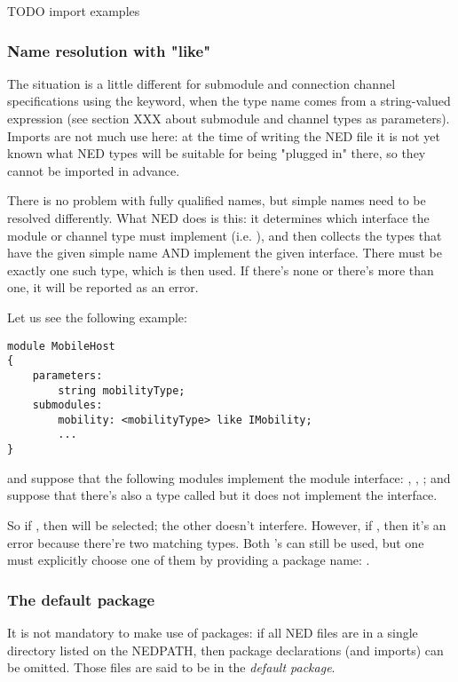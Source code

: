 TODO import examples


\subsubsection{Name resolution with "like"}

The situation is a little different for submodule and connection channel
specifications using the  keyword, when the type name comes
from a string-valued expression (see section XXX about submodule and
channel types as parameters). Imports are not much use here: at the time of
writing the NED file it is not yet known what NED types will be suitable
for being "plugged in" there, so they cannot be imported in advance.

There is no problem with fully qualified names, but simple names need
to be resolved differently. What NED does is this: it determines which
interface the module or channel type must implement (i.e. ),
and then collects the types that have the given simple name AND implement
the given interface. There must be exactly one such type, which is then used.
If there's none or there's more than one, it will be reported as an error.

Let us see the following example:

\begin{Verbatim}
module MobileHost
{
    parameters:
        string mobilityType;
    submodules:
        mobility: <mobilityType> like IMobility;
        ...
}
\end{Verbatim}

and suppose that the following modules implement the  module
interface: , ,
; and suppose that there's also a type
called  but it does not implement the
interface.

So if , then
 will be selected; the other
 doesn't interfere. However, if
, then it's an error because there're two
matching  types. Both 's can still be used,
but one must explicitly choose one of them by providing a package name:
.


\subsubsection{The default package}

It is not mandatory to make use of packages: if all NED files are in a
single directory listed on the NEDPATH, then package declarations (and
imports) can be omitted. Those files are said to be in the \textit{default
package}.






